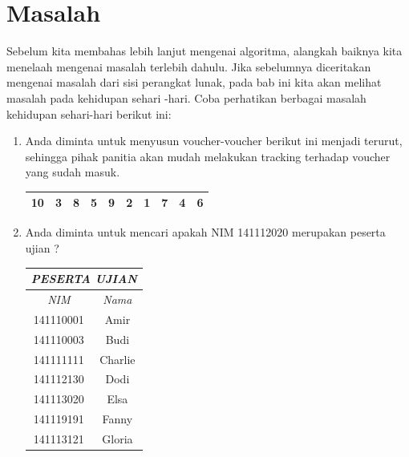 \section{Masalah}
Sebelum kita membahas lebih lanjut mengenai algoritma, alangkah baiknya kita menelaah mengenai masalah terlebih dahulu. Jika sebelumnya diceritakan mengenai masalah dari sisi perangkat lunak, pada bab ini kita akan melihat masalah pada kehidupan sehari -hari. Coba perhatikan berbagai masalah kehidupan sehari-hari berikut ini:

\begin{enumerate}
	\item Anda diminta untuk menyusun voucher-voucher berikut ini menjadi terurut, sehingga pihak panitia akan mudah melakukan tracking terhadap voucher yang sudah masuk.  
	
	
\begin{center} \large
  \begin{tabular}[h!]{| c | c | c | c | c | c | c | c | c | c | }
	\hline
    10 & 3 & 8 & 5 & 9 & 2 & 1 &  7 & 4 & 6 \\
	\hline
  \end{tabular}
\end{center}


	\item Anda diminta untuk mencari apakah NIM 141112020 merupakan peserta ujian ? 
		\large
			\begin{center}
				\begin{tabular}[h!]{| c | c |}
				\hline
				\multicolumn{2}{|c|}{\textit{PESERTA UJIAN}} \\
				\hline	
				\textit{NIM} & \textit{Nama} \\ \hline
				141110001 & Amir \\ \hline
				141110003 & Budi \\ \hline
				141111111 & Charlie \\ \hline
				141112130 & Dodi \\ \hline
				141113020 & Elsa \\ \hline
				141119191 & Fanny \\ \hline
				141113121 & Gloria \\ 
				\hline
				\end{tabular}
		\end{center}
		

\end{enumerate}
